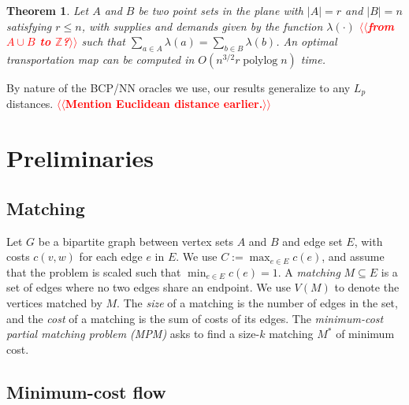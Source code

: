 \documentclass[11pt]{article}
\makeatletter
\def\polylog{\mathop{\mathrm{polylog}}}
\def\tsupply{\lambda}
\theoremstyle{plain}
\newtheorem{theorem}[lemma]{Theorem}
\numberwithin{figure}{section}
\def\n@te#1{\textsf{\boldmath \textbf{$\langle\!\langle$#1$\rangle\!\rangle$}}\leavevmode}
\def\note#1{\textcolor{red}{\n@te{#1}}}
\makeatother
\begin{document}
\begin{theorem}
\label{theorem:orlin}
Let $A$ and $B$ be two point sets in the plane with $|A| = r$ and $|B| = n$ satisfying $r \le n$, with
supplies and demands given by the function $\tsupply(\cdot)$ \note{from $A\cup B$ to $\mathbb{Z}$?} such that
$\sum_{a \in A} \tsupply(a) = \sum_{b \in B} \tsupply(b)$.
An optimal transportation map can be computed in $O(n^{3/2}r\polylog n)$ time.
\end{theorem}



By nature of the BCP/NN oracles we use, our results generalize to any $L_p$ distances. \note{Mention Euclidean distance earlier.}


\section{Preliminaries}
\label{section:prelim}

\subsection{Matching}

Let $G$ be a bipartite graph between vertex sets $A$ and $B$ and edge set $E$,
with costs $c(v, w)$ for each edge $e$ in $E$.
We use $C := \max_{e \in E} c(e)$, and assume that the problem is scaled such
that $\min_{e \in E} c(e) = 1$.
A \emph{matching} $M \subseteq E$ is a set of edges where no two edges share an
endpoint.
We use $V(M)$ to denote the vertices matched by $M$.
The \emph{size} of a matching is the number of edges in the set, and the
\emph{cost} of a matching is the sum of costs of its edges.
The \emph{minimum-cost partial matching problem (MPM)} asks to find a size-$k$
matching $M^*$ of minimum cost.

\subsection{Minimum-cost flow}
\end{document}

